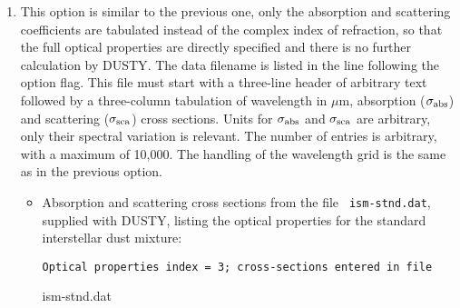 \documentclass[12pt]{article} \usepackage{epsf}
\def\D  {{\sf DUSTY}}
\def\mic    {\hbox{$\mu$m}}
\begin{document}
\begin{enumerate}
\begin{itemize}
\item Draine \& Lee graphite grains with three additional grain types whose {\tt
n} and {\tt k} are provided by the user in data files {\tt amC-zb1.nk}, {\tt
amC-zb2.nk} and {\tt amC-zb3.nk}, distributed with DUSTY.  These files tabulate
the most recent properties for amorphous carbon by Zubko et al \cite{Zubko}:

\begin{verbatim}
   Optical properties index = 2
   Abundances of built-in grain types:
         Sil-Ow  Sil-Oc  Sil-DL  grf-DL amC-Hn SiC-Pg
     x =  0.00    0.00    0.00    0.22   0.00  0.00

   Number of additional components = 3, properties listed in files
                     amC-zb1.nk
                     amC-zb2.nk
                     amC-zb3.nk
   Abundances for these components = 0.45, 0.10, .23
 \end{verbatim}
\end{itemize}

\item This option is similar to the previous one, only the absorption and
scattering coefficients are tabulated instead of the complex index of
refraction, so that the full optical properties are directly specified and there
is no further calculation by \D.  The data filename is listed in the line
following the option flag.  This file must start with a three-line header of
arbitrary text followed by a three-column tabulation of wavelength in \mic,
absorption ($\sigma_{\rm abs}$) and scattering ($\sigma_{\rm sca}$) cross
sections. Units for $\sigma_{\rm abs}$ and $\sigma_{\rm sca}$ are arbitrary,
only
their spectral variation is relevant. The number of entries is arbitrary, with a
maximum of 10,000. The handling of the wavelength grid is the same as in the
previous option.

\begin{itemize}
\item  Absorption and scattering cross sections from the file {\tt
ism-stnd.dat}, supplied with \D, listing the optical properties for the
standard interstellar dust mixture:

{\tt Optical properties index = 3; cross-sections entered in file

\hskip 0.5in        ism-stnd.dat}
\end{itemize}

\end{enumerate}
\end{document}
